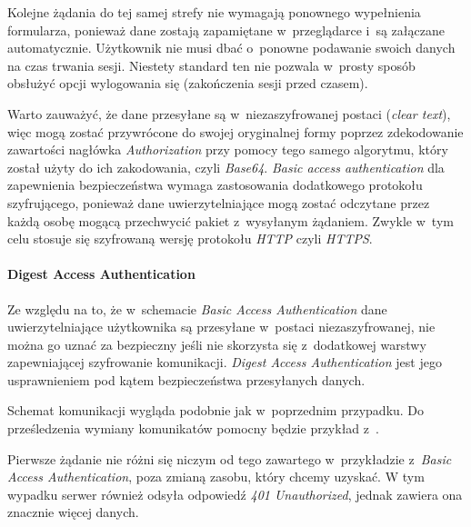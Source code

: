 \documentclass[11pt]{aghdpl}
\begin{document}
Kolejne żądania do tej samej strefy nie wymagają ponownego wypełnienia formularza, ponieważ dane zostają zapamiętane w~przeglądarce i~są załączane automatycznie. Użytkownik nie musi dbać o~ponowne podawanie swoich danych na czas trwania sesji. Niestety standard ten nie pozwala w~prosty sposób obsłużyć opcji wylogowania się (zakończenia sesji przed czasem).

Warto zauważyć, że dane przesyłane są w~niezaszyfrowanej postaci (\emph{clear text}), więc mogą zostać przywrócone do swojej oryginalnej formy poprzez zdekodowanie zawartości nagłówka \emph{Authorization} przy pomocy tego samego algorytmu, który został użyty do ich zakodowania, czyli \emph{Base64}. \emph{Basic access authentication} dla zapewnienia bezpieczeństwa wymaga zastosowania dodatkowego protokołu szyfrującego, ponieważ dane uwierzytelniające mogą zostać odczytane przez każdą osobę mogącą przechwycić pakiet z~wysyłanym żądaniem. Zwykle w~tym celu stosuje się szyfrowaną wersję protokołu \emph{HTTP} czyli \emph{HTTPS}.

\paragraph{Digest Access Authentication}

Ze względu na to, że w~schemacie \emph{Basic Access Authentication} dane uwierzytelniające użytkownika są przesyłane w~postaci niezaszyfrowanej, nie można go uznać za bezpieczny jeśli nie skorzysta się z~dodatkowej warstwy zapewniającej szyfrowanie komunikacji. \emph{Digest Access Authentication} jest jego usprawnieniem pod kątem bezpieczeństwa przesyłanych danych.

Schemat komunikacji wygląda podobnie jak w~poprzednim przypadku. Do prześledzenia wymiany komunikatów pomocny będzie przykład z~\cite{BDA99}.

Pierwsze żądanie nie różni się niczym od tego zawartego w~przykładzie z~\emph{Basic Access Authentication}, poza zmianą zasobu, który chcemy uzyskać. W tym wypadku serwer również odsyła odpowiedź \emph{401 Unauthorized}, jednak zawiera ona znacznie więcej danych.
\end{document}
